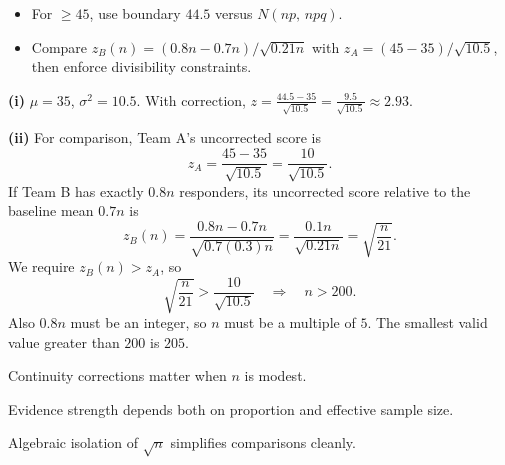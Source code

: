 \begin{hint}
\begin{itemize}[leftmargin=*]
  \item For $\ge 45$, use boundary $44.5$ versus $N(np,\,npq)$.
  \item Compare $z_{B}(n)=(0{.}8n-0{.}7n)/\sqrt{0{.}21n}$ with $z_{A}=(45-35)/\sqrt{10{.}5}$, then enforce divisibility constraints.
\end{itemize}
\end{hint}

\begin{solution}
\textbf{(i)} $\mu=35$, $\sigma^{2}=10{.}5$. With correction, $z=\frac{44{.}5-35}{\sqrt{10{.}5}}=\frac{9{.}5}{\sqrt{10{.}5}}\approx 2{.}93$.

\textbf{(ii)} For comparison, Team A's uncorrected score is
\[
z_A=\frac{45-35}{\sqrt{10{.}5}}=\frac{10}{\sqrt{10{.}5}}.
\]
If Team B has exactly $0{.}8n$ responders, its uncorrected score relative to the baseline mean $0{.}7n$ is
\[
z_B(n)=\frac{0{.}8n-0{.}7n}{\sqrt{0{.}7(0{.}3)n}}
=\frac{0{.}1n}{\sqrt{0{.}21n}}
=\sqrt{\frac{n}{21}}.
\]
We require $z_B(n)>z_A$, so
\[
\sqrt{\frac{n}{21}}>\frac{10}{\sqrt{10{.}5}}
\quad\Longrightarrow\quad n>200.
\]
Also $0{.}8n$ must be an integer, so $n$ must be a multiple of $5$. The smallest valid value greater than $200$ is $\boxed{205}$.
\end{solution}

\begin{takeaways}
\item Continuity corrections matter when $n$ is modest.
\item Evidence strength depends both on proportion and effective sample size.
\item Algebraic isolation of $\sqrt{n}$ simplifies comparisons cleanly.
\end{takeaways}

